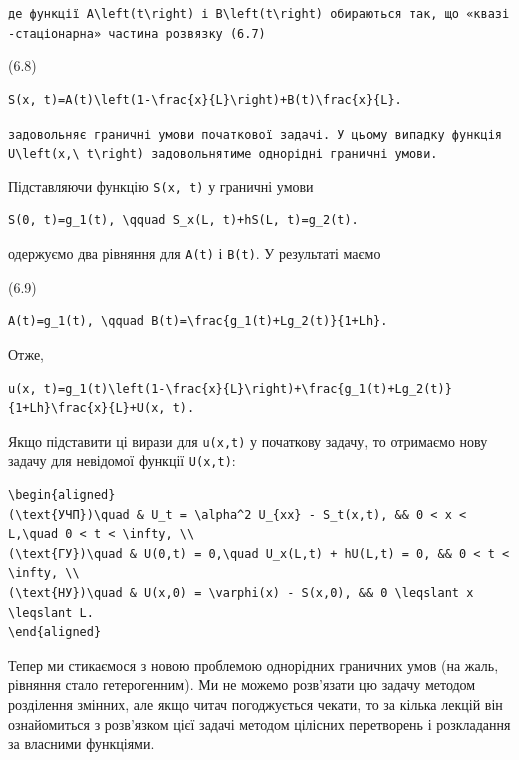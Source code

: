 \documentclass[
  ukrainian,
]{article}
\begin{document}
\texttt{де\ функції\ \textquotesingle{}A\textbackslash{}left(t\textbackslash{}right)\textquotesingle{}\ і\ \textquotesingle{}B\textbackslash{}left(t\textbackslash{}right)\textquotesingle{}\ обираються\ так,\ що\ «квазі-стаціонарна»\ частина\ розв\textquotesingle{}язку\ (6.7)}

(6.8)

\begin{verbatim}
S(x, t)=A(t)\left(1-\frac{x}{L}\right)+B(t)\frac{x}{L}.
\end{verbatim}

\texttt{задовольняє\ граничні\ умови\ початкової\ задачі.\ У\ цьому\ випадку\ функція\ \textquotesingle{}U\textbackslash{}left(x,\textbackslash{}\ t\textbackslash{}right)\textquotesingle{}\ задовольнятиме\ однорідні\ граничні\ умови.}

Підставляючи функцію \texttt{S(x,\ t)} у граничні умови

\begin{verbatim}
S(0, t)=g_1(t), \qquad S_x(L, t)+hS(L, t)=g_2(t).
\end{verbatim}

одержуємо два рівняння для \texttt{A(t)} і \texttt{B(t)}. У результаті
маємо

(6.9)

\begin{verbatim}
A(t)=g_1(t), \qquad B(t)=\frac{g_1(t)+Lg_2(t)}{1+Lh}.
\end{verbatim}

Отже,

\begin{verbatim}
u(x, t)=g_1(t)\left(1-\frac{x}{L}\right)+\frac{g_1(t)+Lg_2(t)}{1+Lh}\frac{x}{L}+U(x, t).
\end{verbatim}

Якщо підставити ці вирази для \texttt{u(x,t)} у початкову задачу, то
отримаємо нову задачу для невідомої функції \texttt{U(x,t)}:

\begin{verbatim}
\begin{aligned}
(\text{УЧП})\quad & U_t = \alpha^2 U_{xx} - S_t(x,t), && 0 < x < L,\quad 0 < t < \infty, \\
(\text{ГУ})\quad & U(0,t) = 0,\quad U_x(L,t) + hU(L,t) = 0, && 0 < t < \infty, \\
(\text{НУ})\quad & U(x,0) = \varphi(x) - S(x,0), && 0 \leqslant x \leqslant L.
\end{aligned}
\end{verbatim}

Тепер ми стикаємося з новою проблемою однорідних граничних умов (на
жаль, рівняння стало гетерогенним). Ми не можемо розв'язати цю задачу
методом розділення змінних, але якщо читач погоджується чекати, то за
кілька лекцій він ознайомиться з розв'язком цієї задачі методом цілісних
перетворень і розкладання за власними функціями.
\end{document}
